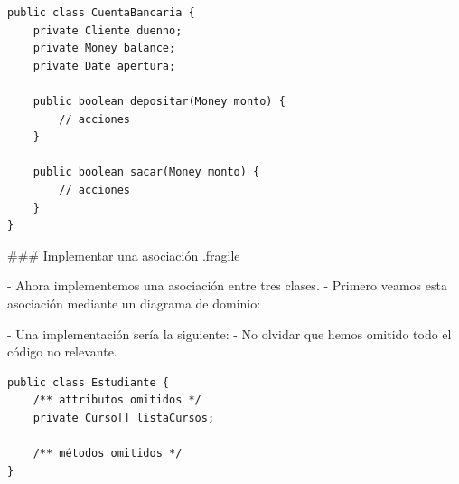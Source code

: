 \columnsend

\columnsbegin




\vspace{-1em}
\begin{lstlisting}
public class CuentaBancaria {
    private Cliente duenno;
    private Money balance;
    private Date apertura;

    public boolean depositar(Money monto) {
        // acciones
    }

    public boolean sacar(Money monto) {
        // acciones
    }
}
\end{lstlisting}

\columnsend

### Implementar una asociación {.fragile}

- Ahora implementemos una asociación entre tres clases.
- Primero veamos esta asociación mediante un diagrama de dominio:


- Una implementación sería la siguiente:
    - No olvidar que hemos omitido todo el código no relevante.

\columnsbegin


\begin{lstlisting}
public class Estudiante {
    /** attributos omitidos */
    private Curso[] listaCursos;

    /** métodos omitidos */
}
\end{lstlisting}

